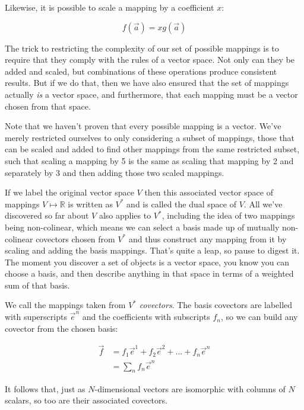 Likewise, it is possible to scale a mapping by a coefficient $x$:

$$
f(\vec{a}) = x g(\vec{a})
$$

The trick to restricting the complexity of our set of possible mappings is to require that they comply with the rules of a vector space. Not only can they be added and scaled, but combinations of these operations produce consistent results. But if we do that, then we have also ensured that the set of mappings actually \textit{is} a vector space, and furthermore, that each mapping must be a vector chosen from that space.

Note that we haven't proven that every possible mapping is a vector. We've merely restricted ourselves to only considering a subset of mappings, those that can be scaled and added to find other mappings from the same restricted subset, such that scaling a mapping by 5 is the same as scaling that mapping by 2 and separately by 3 and then adding those two scaled mappings.

If we label the original vector space $V$ then this associated vector space of mappings $V \mapsto \mathbb{R}$ is written as $V^*$ and is called the dual space of $V$. All we've discovered so far about $V$ also applies to $V^*$, including the idea of two mappings being non-colinear, which means we can select a basis made up of mutually non-colinear covectors chosen from $V^*$ and thus construct any mapping from it by scaling and adding the basis mappings. That's quite a leap, so pause to digest it. The moment you discover a set of objects is a vector space, you know you can choose a basis, and then describe anything in that space in terms of a weighted sum of that basis.

We call the mappings taken from $V^*$ \textit{covectors}. The basis covectors are labelled with superscripts $\vec{e}^n$ and the coefficients with subscripts $f_n$, so we can build any covector from the chosen basis:

\begin{equation}
    \begin{split}
    \vec{f} &= f_1 \vec{e}^1 + f_2 \vec{e}^2 + ... + f_n \vec{e}^n \\
            &= \sum_n f_n \vec{e}^n
    \end{split}
\end{equation}

It follows that, just as $N$-dimensional vectors are isomorphic with columns of $N$ scalars, so too are their associated covectors.

